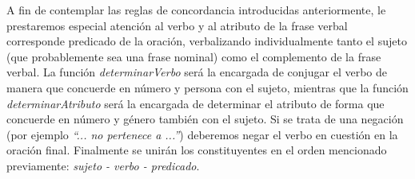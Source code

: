 \noindent
A fin de contemplar las reglas de concordancia introducidas anteriormente, le prestaremos especial atención al verbo y al atributo de la frase verbal corresponde predicado de la oración, verbalizando individualmente tanto el sujeto (que probablemente sea una frase nominal) como el complemento de la frase verbal. La función \emph{determinarVerbo} será la encargada de conjugar el verbo de manera que concuerde en número y persona con el sujeto, mientras que la función \emph{determinarAtributo} será la encargada de determinar el atributo de forma que concuerde en número y género también con el sujeto. Si se trata de una negación (por ejemplo \emph{``... no pertenece a ...''}) deberemos negar el verbo en cuestión en la oración final. Finalmente se unirán los constituyentes en el orden mencionado previamente: \emph{sujeto - verbo - predicado}.
